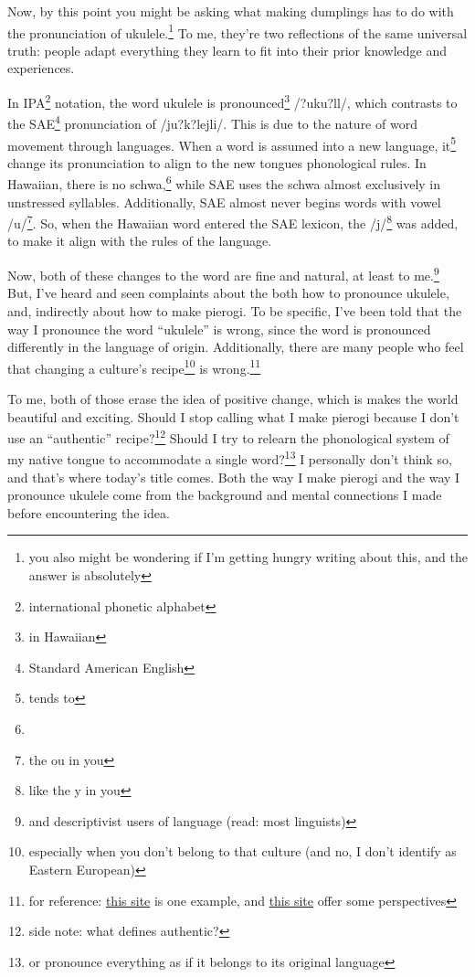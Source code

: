 \documentclass[12pt]{article}[titlepage]
\newcommand{\say}[1]{``#1''}
\newcommand{\1}{\={a}}
\newcommand{\2}{\={e}}
\newcommand{\3}{\={\i}}
\newcommand{\4}{\=o}
\newcommand{\5}{\=u}
\newcommand{\6}{\={A}}
\renewcommand{\,}{\textsuperscript{,}}
\begin{document}
Now, by this point you might be asking what making dumplings has to do with the pronunciation of ukulele.\footnote{you also might be wondering if I'm getting hungry writing about this, and the answer is absolutely}
To me, they're two reflections of the same universal truth: people adapt everything they learn to fit into their prior knowledge and experiences.

In IPA\footnote{international phonetic alphabet} notation, the word ukulele is pronounced\footnote{in Hawaiian} /?uku?l\textepsilon{}l\textepsilon{}/, which contrasts to the SAE\footnote{Standard American English} pronunciation of /ju?k\textschwa?lejli/.
This is due to the nature of word movement through languages.
When a word is assumed into a new language, it\footnote{tends to} change its pronunciation to align to the new tongues phonological rules.
In Hawaiian, there is no schwa,\footnote{\textschwa{}} while SAE uses the schwa almost exclusively in unstressed syllables.
Additionally, SAE almost never begins words with vowel /u/\footnote{the ou in you}.
So, when the Hawaiian word entered the SAE lexicon, the /j/\footnote{like the y in you} was added, to make it align with the rules of the language.

Now, both of these changes to the word are fine and natural, at least to me.\footnote{and descriptivist users of language (read: most linguists)}
But, I've heard and seen complaints about the both how to pronounce ukulele, and, indirectly about how to make pierogi.
To be specific, I've been told that the way I pronounce the word \say{ukulele} is wrong, since the word is pronounced differently in the language of origin.
Additionally, there are many people who feel that changing a culture's recipe\footnote{especially when you don't belong to that culture (and no, I don't identify as Eastern European)} is wrong.\footnote{for reference: \href{https://www.npr.org/sections/thesalt/2016/03/22/471309991/when-chefs-become-famous-cooking-other-cultures-food}{this site} is one example, and \href{http://www.baystbull.com/in-food-culture-is-appropriation-actually-possible/}{this site} offer some perspectives}

To me, both of those erase the idea of positive change, which is makes the world beautiful and exciting.
Should I stop calling what I make pierogi because I don't use an \say{authentic} recipe?\footnote{side note: what defines authentic?}
Should I try to relearn the phonological system of my native tongue to accommodate a single word?\footnote{or pronounce everything as if it belongs to its original language}
I personally don't think so, and that's where today's title comes.
Both the way I make pierogi and the way I pronounce ukulele come from the background and mental connections I made before encountering the idea.
\end{document}
